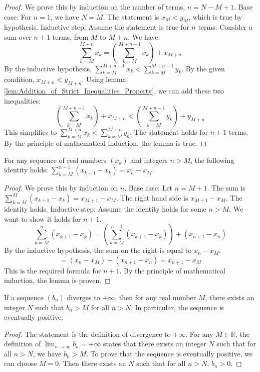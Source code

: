 \begin{proof}
    We prove this by induction on the number of terms, $n = N - M + 1$.
    Base case: For $n=1$, we have $N=M$. The statement is $x_M < y_M$, which is true by hypothesis.
    Inductive step: Assume the statement is true for $n$ terms. Consider a sum over $n+1$ terms, from $M$ to $M+n$. We have:
    $$\sum_{k=M}^{M+n} x_k = \left(\sum_{k=M}^{M+n-1} x_k\right) + x_{M+n}$$
    By the inductive hypothesis, $\sum_{k=M}^{M+n-1} x_k < \sum_{k=M}^{M+n-1} y_k$. By the given condition, $x_{M+n} < y_{M+n}$.
    Using lemma \ref{lem:Addition_of_Strict_Inequalities_Property}, we can add these two inequalities:
    $$\left(\sum_{k=M}^{M+n-1} x_k\right) + x_{M+n} < \left(\sum_{k=M}^{M+n-1} y_k\right) + y_{M+n}$$
    This simplifies to $\sum_{k=M}^{M+n} x_k < \sum_{k=M}^{M+n} y_k$.
    The statement holds for $n+1$ terms. By the principle of mathematical induction, the lemma is true.
\end{proof}

\begin{lemma}
    \label{lem:Telescoping_Sum}
    For any sequence of real numbers $(x_k)$ and integers $n > M$, the following identity holds: $\sum_{k=M}^{n-1} (x_{k+1} - x_k) = x_n - x_M$.
\end{lemma}

\begin{proof}
    We prove this by induction on $n$.
    Base case: Let $n=M+1$. The sum is $\sum_{k=M}^{M} (x_{k+1} - x_k) = x_{M+1} - x_M$. The right hand side is $x_{M+1} - x_M$. The identity holds.
    Inductive step: Assume the identity holds for some $n > M$. We want to show it holds for $n+1$.
    $$\sum_{k=M}^{n} (x_{k+1} - x_k) = \left(\sum_{k=M}^{n-1} (x_{k+1} - x_k)\right) + (x_{n+1} - x_n)$$
    By the inductive hypothesis, the sum on the right is equal to $x_n - x_M$.
    $$= (x_n - x_M) + (x_{n+1} - x_n) = x_{n+1} - x_M$$
    This is the required formula for $n+1$. By the principle of mathematical induction, the lemma is proven.
\end{proof}

\begin{lemma}
    \label{lem:Property_of_Divergent_Sequences}
    If a sequence $(b_n)$ diverges to $+\infty$, then for any real number $M$, there exists an integer $N$ such that $b_n > M$ for all $n > N$. In particular, the sequence is eventually positive.
\end{lemma}

\begin{proof}
    The statement is the definition of divergence to $+\infty$. For any $M \in \mathbb{R}$, the definition of $\lim_{n \to \infty} b_n = +\infty$ states that there exists an integer $N$ such that for all $n > N$, we have $b_n > M$. To prove that the sequence is eventually positive, we can choose $M=0$. Then there exists an $N$ such that for all $n > N$, $b_n > 0$.
\end{proof}

